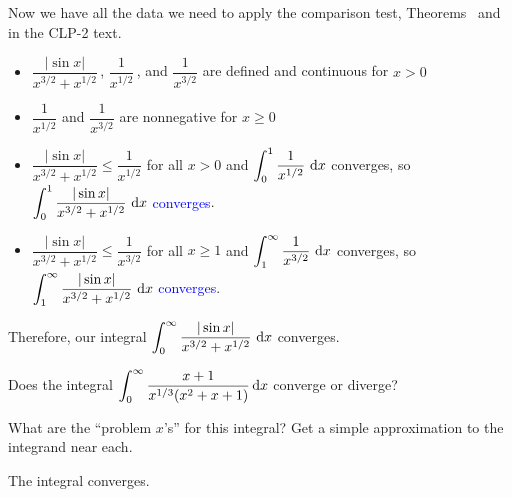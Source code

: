 \begin{solution}
Now we have all the data we need to apply the comparison test, Theorems~ and  in the CLP-2 text.
\begin{itemize}
\item $\dfrac{|\sin x|}{x^{3/2}+x^{1/2}}$\,, $\dfrac{1}{x^{1/2}}$\,, and $\dfrac{1}{x^{3/2}}$ are defined and continuous for $x>0$
\item $\dfrac{1}{x^{1/2}}$ and $\dfrac{1}{x^{3/2}}$ are nonnegative for $x \ge 0$
\item $\dfrac{|\sin x|}{x^{3/2}+x^{1/2}}\le \dfrac{1}{x^{1/2}}$ for all $x > 0$ and
$\displaystyle\int_0^1\dfrac{1}{x^{1/2}}~\mathrm{d}x$ converges, so \textcolor{blue}{ $\displaystyle\int_0^{1\vphantom{\frac12}}\dfrac{|\sin x|}{x^{3/2}+x^{1/2}}~\mathrm{d}x$ converges}.
\item $\dfrac{|\sin x|}{x^{3/2}+x^{1/2}}\le \dfrac{1}{x^{3/2}}$ for all $x \ge 1$ and
$\displaystyle\int_1^\infty\dfrac{1}{x^{3/2}}~\mathrm{d}x$ converges, so \textcolor{blue}{ $\displaystyle\int_1^{\infty\vphantom{\frac12}}\dfrac{|\sin x|}{x^{3/2}+x^{1/2}}~\mathrm{d}x$ converges}.
\end{itemize}

Therefore, our integral \textcolor{blue}{$\displaystyle\int_0^\infty \frac{|\sin x|}{x^{3/2}+x^{1/2}}~\mathrm{d}x$} {converges}.

\end{solution}


\begin{Mquestion}[M121 2000A]
Does the integral
$\displaystyle\int_0^\infty\frac{x+1}{x^{1/3}(x^2+x+1)}\,\mathrm{d}x$
converge or diverge?
\end{Mquestion}

\begin{hint}
What are the ``problem $x$'s'' for this integral? Get a simple
approximation to the integrand near each.
\end{hint}

\begin{answer}
The integral converges.
\end{answer}

